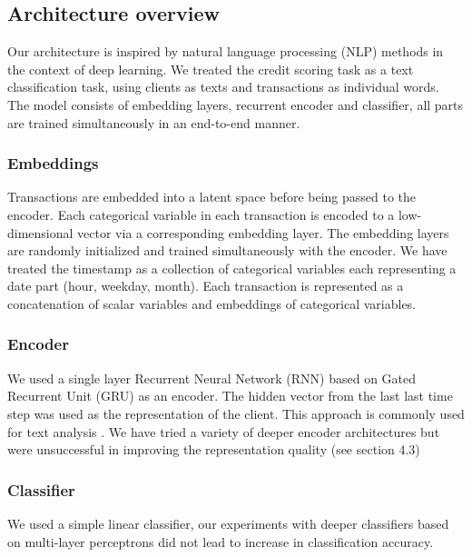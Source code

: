 \documentclass{sigkddExp}
\begin{document}
\subsection{Architecture overview}
Our architecture is inspired by natural language processing (NLP) methods in the context of deep learning. We treated the credit scoring task as a text classification task, using clients as texts and transactions as individual words.
The model consists of embedding layers, recurrent encoder and classifier, all parts are trained simultaneously in an end-to-end manner.

\subsubsection{Embeddings}

Transactions are embedded into a latent space before being passed to the encoder.  
Each categorical variable in each transaction is encoded to a low-dimensional vector via a corresponding embedding layer. The embedding layers are randomly initialized and trained simultaneously with the encoder. We have treated the timestamp as a collection of categorical variables each representing a date part (hour, weekday, month). Each transaction is represented as a concatenation of scalar variables and embeddings of categorical variables.

\subsubsection{Encoder}

We used a single layer Recurrent Neural Network (RNN) based on Gated Recurrent Unit (GRU)\cite{DBLP:journals/corr/ChoMGBSB14} as an encoder.  The hidden vector from the last last time step was used as the representation of the client. This approach is commonly used for text analysis \cite{NIPS2014_5346}. We have tried a variety of deeper encoder architectures  but were unsuccessful in improving the representation quality (see section 4.3)

\subsubsection{Classifier}

We used a simple linear classifier, our experiments with deeper classifiers based on multi-layer perceptrons did not lead to increase in classification accuracy.
\end{document}
